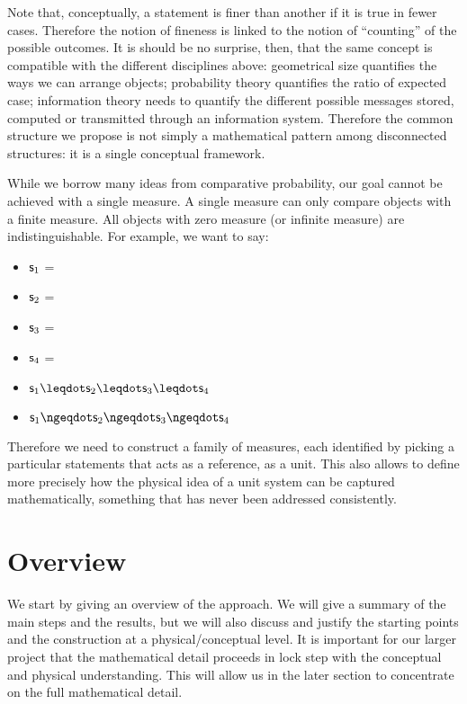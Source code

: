 \documentclass{article}
\begin{document}
Note that, conceptually, a statement is finer than another if it is true in fewer cases. Therefore the notion of fineness is linked to the notion of ``counting'' of the possible outcomes. It is should be no surprise, then, that the same concept is compatible with the different disciplines above: geometrical size quantifies the ways we can arrange objects; probability theory quantifies the ratio of expected case; information theory needs to quantify the different possible messages stored, computed or transmitted through an information system. Therefore the common structure we propose is not simply a mathematical pattern among disconnected structures: it is a single conceptual framework.

While we borrow many ideas from comparative probability, our goal cannot be achieved with a single measure. A single measure can only compare objects with a finite measure. All objects with zero measure (or infinite measure) are indistinguishable. For example, we want to say:
\begin{itemize}
    \item $\mathsf{s}_1$ = 
    \item $\mathsf{s}_2$ = 
    \item $\mathsf{s}_3$ = 
    \item $\mathsf{s}_4$ = 
    \item $\stmt_1 \finer \stmt_2 \finer \stmt_3 \finer \stmt_4$
    \item $\stmt_1 \ncoarser \stmt_2 \ncoarser \stmt_3 \ncoarser \stmt_4$
\end{itemize}
Therefore we need to construct a family of measures, each identified by picking a particular statements that acts as a reference, as a unit. This also allows to define more precisely how the physical idea of a unit system can be captured mathematically, something that has never been addressed consistently.

\section{Overview}

We start by giving an overview of the approach. We will give a summary of the main steps and the results, but we will also discuss and justify the starting points and the construction at a physical/conceptual level. It is important for our larger project that the mathematical detail proceeds in lock step with the conceptual and physical understanding. This will allow us in the later section to concentrate on the full  mathematical detail.
\end{document}

